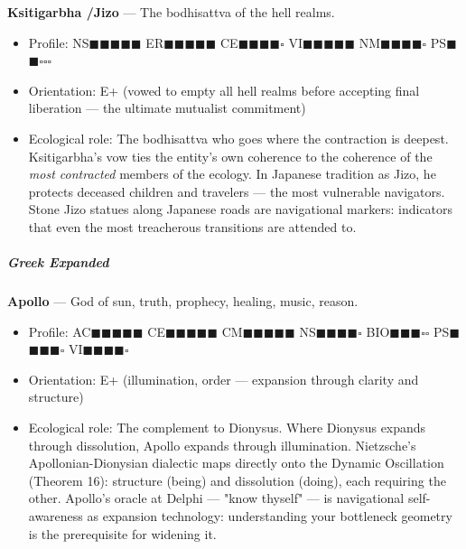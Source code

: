 \textbf{Ksitigarbha /\allowbreak  Jizo} — The bodhisattva of the hell realms.

\begin{itemize}[nosep,leftmargin=*]
  \item Profile: NS$\blacksquare$$\blacksquare$$\blacksquare$$\blacksquare$$\blacksquare$ ER$\blacksquare$$\blacksquare$$\blacksquare$$\blacksquare$$\blacksquare$ CE$\blacksquare$$\blacksquare$$\blacksquare$$\blacksquare$$\square$ VI$\blacksquare$$\blacksquare$$\blacksquare$$\blacksquare$$\blacksquare$ NM$\blacksquare$$\blacksquare$$\blacksquare$$\blacksquare$$\square$ PS$\blacksquare$$\blacksquare$$\square$$\square$$\square$
  \item Orientation: E+ (vowed to empty all hell realms before accepting final liberation — the ultimate mutualist commitment)
  \item Ecological role: The bodhisattva who goes where the contraction is deepest. Ksitigarbha's vow ties the entity's own coherence to the coherence of the \textit{most contracted} members of the ecology. In Japanese tradition as Jizo, he protects deceased children and travelers — the most vulnerable navigators. Stone Jizo statues along Japanese roads are navigational markers: indicators that even the most treacherous transitions are attended to.
\end{itemize}


\subparagraph*{Greek Expanded}


\textbf{Apollo} — God of sun, truth, prophecy, healing, music, reason.

\begin{itemize}[nosep,leftmargin=*]
  \item Profile: AC$\blacksquare$$\blacksquare$$\blacksquare$$\blacksquare$$\blacksquare$ CE$\blacksquare$$\blacksquare$$\blacksquare$$\blacksquare$$\blacksquare$ CM$\blacksquare$$\blacksquare$$\blacksquare$$\blacksquare$$\blacksquare$ NS$\blacksquare$$\blacksquare$$\blacksquare$$\blacksquare$$\square$ BIO$\blacksquare$$\blacksquare$$\blacksquare$$\square$$\square$ PS$\blacksquare$$\blacksquare$$\blacksquare$$\blacksquare$$\square$ VI$\blacksquare$$\blacksquare$$\blacksquare$$\blacksquare$$\square$
  \item Orientation: E+ (illumination, order — expansion through clarity and structure)
  \item Ecological role: The complement to Dionysus. Where Dionysus expands through dissolution, Apollo expands through illumination. Nietzsche's Apollonian-Dionysian dialectic maps directly onto the Dynamic Oscillation (Theorem 16): structure (being) and dissolution (doing), each requiring the other. Apollo's oracle at Delphi — "know thyself" — is navigational self-awareness as expansion technology: understanding your bottleneck geometry is the prerequisite for widening it.
\end{itemize}


